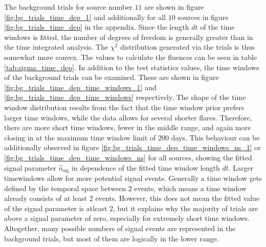The background trials for source number $\num{11}$ are shown in figure \ref{fig:bg_trials_time_dep_1} and additionally for all $\num{10}$ sources in figure \ref{fig:bg_trials_time_dep} in the appendix.
Since the length $dt$ of the time windows is fitted, the number of degrees of freedom is generally greater than in the time integrated analysis.
The $\chi^2$ distribution generated via the trials is thus somewhat more convex.
The values to calculate the fluences can be seen in table \ref{tab:sigma_time_dep}.
In addition to the test statistics values, the time windows of the background trials can be examined.
These are shown in figure \ref{fig:bg_trials_time_dep_time_windows_1} and \ref{fig:bg_trials_time_dep_time_windows} respectively.
The shape of the time window distribution results from the fact that the time window prior prefers larger time windows, while the data allows for several shorter flares.
Therefore, there are more short time windows, fewer in the middle range, and again more closing in at the maximum time window limit of $\num{200}$ days.
This behaviour can be additionally observed in figure \ref{fig:bg_trials_time_dep_time_windows_ns_1} or \ref{fig:bg_trials_time_dep_time_windows_ns} for all sources, showing the fitted signal parameter $\hat{n}_\text{sig}$ in dependence of the fitted time window length $dt$.
Larger timewindows allow for more potential signal events.
Generally a time window gets defined by the temporal space between $\num{2}$ events, which means a time window already consists of at least $\num{2}$ events.
However, this does not mean the fitted value of the signal parameter is atleast $2$, but it explains why the majority of trials are above a signal parameter of zero, especially for extremely short time windows.
Altogether, many possible numbers of signal events are represented in the background trials, but most of them are logically in the lower range.
